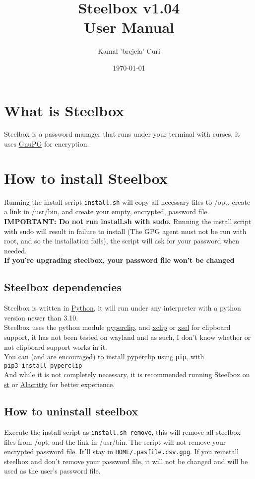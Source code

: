 \documentclass{article}
\title{\textbf{Steelbox v1.04} \\ User Manual}
\date{\today}
\author{Kamal 'brejela' Curi}
\begin{document}
  \maketitle
  \tableofcontents
  \newpage

  \section{What is Steelbox}
  Steelbox is a password manager that runs under your terminal with curses, it
  uses \href{https://gnupg.org/}{GnuPG} for encryption.

  \section{How to install Steelbox}
  Running the install script \texttt{install.sh} will copy all necessary files to /opt, create a link in /usr/bin,
  and create your empty, encrypted, password file. \textbf{IMPORTANT: Do not run install.sh with sudo.}
  Running the install script with sudo will result in failure to install (The GPG agent must not be run with root, and so the installation fails),
  the script will ask for your password when needed.\\
  \textbf{If you're upgrading steelbox, your password file won't be changed}
  \subsection{Steelbox dependencies}
  Steelbox is written in \href{https://www.python.org/}{Python}, it will run under any interpreter with a python
  version newer than 3.10.
  \\
  Steelbox uses the python module \href{https://github.com/asweigart/pyperclip}{pyperclip}, and
   \href{https://github.com/astrand/xclip}{xclip} or \href{https://github.com/kfish/xsel}{xsel}
  for clipboard support, it has not been tested on wayland and as such, I don't know whether or not clipboard
  support works in it. \\
  You can (and are encouraged) to install pyperclip using \texttt{pip}, with \\
  \texttt{pip3 install pyperclip}\\
  And while it is not completely necessary, it is recommended running Steelbox
  on \href{https://st.suckless.org/}{st} or \href{https://alacritty.org/}{Alacritty} for better experience.
  \subsection{How to uninstall steelbox}
  Execute the install script as \texttt{install.sh remove}, this will remove all steelbox files from /opt, and the link in /usr/bin.
  The script will not remove your encrypted password file. It'll stay in \texttt{\textdollar HOME/.pasfile.csv.gpg}.
  If you reinstall steelbox and don't remove your password file, it will not be changed and will be used as the user's password file.
\end{document}
